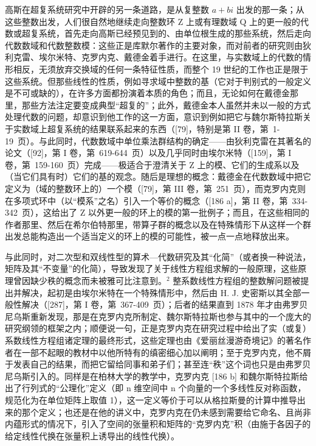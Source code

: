 高斯在超复系统研究中开辟的另一条道路，是从复整数 \(a + bi\) 出发的那一条；从这些整数出发，人们很自然地继续走向整数环 Z 上或有理数域 Q 上的更一般的代数或超复系统，首先走向高斯已经预见到的、由单位根生成的那些系统，然后走向代数数域和代数整数模：这些正是库默尔著作的主要对象，而对前者的研究则由狄利克雷、埃尔米特、克罗内克、戴德金着手进行。在这里，与实数域上的代数的情形相反，无须放弃交换域的任何一条特征性质，而整个 19 世纪的工作也正是限于这些系统。但那些线性的性质，例如寻求域中整数的基（它对于判别式的一般定义是不可或缺的），在许多方面都扮演着本质的角色；而且，无论如何在戴德金那里，那些方法注定要变成典型“超复的”；此外，戴德金本人虽然并未以一般的方式处理代数的问题，却意识到他工作的这一方面，意识到例如把它与魏尔斯特拉斯关于实数域上超复系统的结果联系起来的东西（{[}79{]}，特别是第 II 卷，第~1-19~页）。与此同时，代数数域中单位乘法群结构的确定——由狄利克雷在其著名的论文（{[}92{]}，第 I 卷，第~619-644~页）以及几乎同时由埃尔米特（{[}159{]}，第 I 卷，第~159-160~页）完成——极适合于澄清关于 Z 上的模、它们的生成系以及（当它们具有时）它们的基的观念。随后是理想的概念：戴德金在代数数域中把它定义为（域的整数环上的）一个模（{[}79{]}，第 III 卷，第~251~页），而克罗内克则在多项式环中（以“模系”之名）引入一个等价的概念（{[}186 a{]}，第 II 卷，第~334-342~页），这给出了 Z 以外更一般的环上的模的第一批例子；而且，在这些相同的作者那里、然后在希尔伯特那里，带算子群的概念以及在特殊情形下从这样一个群出发总能构造出一个适当定义的环上的模的可能性，被一点一点地释放出来。

与此同时，对二次型和双线性型的算术—代数研究及其“化简”（或者换一种说法，矩阵及其“不变量”的化简），导致发现了关于线性方程组求解的一般原理，这些原理曾因缺少秩的概念而未被雅可比注意到。\(^{2}\) 整系数线性方程组的整数解问题被提出并解决，起初是由埃尔米特在一个特殊情形中，然后由 H. J. 史密斯以其全部一般性解决（{[}287{]}，第 I 卷，第~367-409~页）；后者的结果直到 1878 年才由弗罗贝尼乌斯重新发现，那是在克罗内克所制定、魏尔斯特拉斯也参与其中的一个庞大的研究纲领的框架之内；顺便说一句，正是克罗内克在研究过程中给出了实（或复）系数线性方程组诸定理的最终形式，这些定理也由《爱丽丝漫游奇境记》的著名作者在一部不起眼的教材中以他所特有的缜密细心加以阐明；至于克罗内克，他不屑于发表自己的结果，而把它留给同事和弟子们；甚至连“秩”这个词也只是由弗罗贝尼乌斯引入的。同样是在柏林大学的教学中，克罗内克 {[}186 b{]} 和魏尔斯特拉斯给出了行列式的“公理化”定义（即 n 维空间中 n 个向量的一个多线性反对称函数，规范化为在单位矩阵上取值 1），这一定义等价于可以从格拉斯曼的计算中推导出来的那个定义；也还是在他的讲义中，克罗内克在仍未感到需要给它命名、且尚非内蕴形式的情况下，引入了空间的张量积和矩阵的“克罗内克”积（由施于各因子的给定线性代换在张量积上诱导出的线性代换）。

